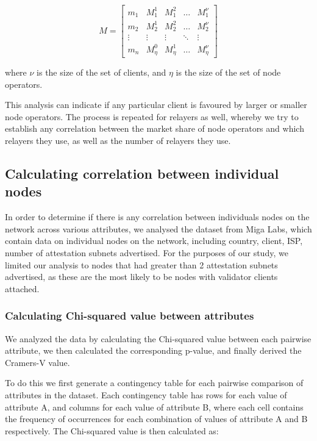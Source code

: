 \documentclass[conference]{IEEEtran}
\begin{document}
\[
M = \begin{bmatrix}
m_1 & M_1^1 & M_1^2 & \ldots & M_1^{\nu} \\
m_2 & M_2^1 & M_2^2 & \ldots & M_2^{\nu} \\
\vdots & \vdots & \vdots & \ddots & \vdots \\
m_n & M_{\eta}^0 & M_{\eta}^1 & \ldots & M_{\eta}^{\nu}
\end{bmatrix}
\]

where $\nu$ is the size of the set of clients, and $\eta$ is the size of the set of node operators.

This analysis can indicate if any particular client is favoured by larger or smaller node operators. The process is repeated for relayers as well, whereby we try to establish any correlation between the market share of node operators and which relayers they use, as well as the number of relayers they use.

\subsection{Calculating correlation between individual nodes}

In order to determine if there is any correlation between individuals nodes on the network across various attributes, we analysed the dataset from Miga Labs, which contain data on individual nodes on the network, including country, client, ISP, number of attestation subnets advertised. For the purposes of our study, we limited our analysis to nodes that had greater than 2 attestation subnets advertised, as these are the most likely to be nodes with validator clients attached.

\subsubsection{Calculating Chi-squared value between attributes}

We analyzed the data by calculating the Chi-squared value between each pairwise attribute, we then calculated the corresponding p-value, and finally derived the Cramers-V value.

To do this we first generate a contingency table for each pairwise comparison of attributes in the dataset.  Each contingency table has rows for each value of attribute A, and columns for each value of attribute B, where each cell contains the frequency of occurrences for each combination of values of attribute A and B respectively. The Chi-squared value is then calculated as:
\end{document}
